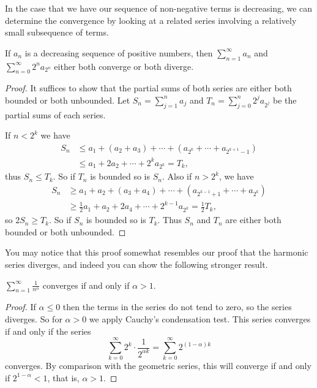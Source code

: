 In the case that we have our sequence of non-negative terms is decreasing, we can determine the convergence by looking at a related series involving a relatively small subsequence of terms.

\begin{theorem}
	If $a_n$ is a decreasing sequence of positive numbers, then $\sum_{n = 1}^{\infty} a_n$ and $\sum_{n = 0}^{\infty} 2^n a_{2^n}$ either both converge or both diverge.
\end{theorem}
\begin{proof}
It suffices to show that the partial sums of both series are either both bounded or both unbounded.
Let $S_n = \sum_{j = 1}^{n} a_j$ and $T_n = \sum_{j = 0}^n 2^j a_{2^j}$ be the partial sums of each series.

If $n < 2^k$ we have
\begin{align*}
	S_n &\leq a_1 + (a_2 + a_3) + \cdots + (a_{2^k} + \cdots + a_{2^{k + 1} - 1}) \\
	&\leq a_1 + 2 a_2 + \cdots + 2^k a_{2^k} = T_k,
\end{align*}
thus $S_n \leq T_k$. So if $T_n$ is bounded so is $S_n$. Also if $n > 2^k$, we have
\begin{align*}
	S_n &\geq a_1 + a_2 + (a_3 + a_4) + \cdots + (a_{2^{k -1}+1} + \cdots + a_{2^k}) \\
	&\geq \frac{1}{2}a_1 + a_2 + 2 a_4 + \cdots + 2^{k - 1}a_{2^k} = \frac{1}{2}T_k,
\end{align*}
so $2S_n \geq T_k$. So if $S_n$ is bounded so is $T_k$.
Thus $S_n$ and $T_n$ are either both bounded or both unbounded. 
\end{proof}

You may notice that this proof somewhat resembles our proof that the harmonic series diverges, and indeed you can show the following stronger result.

\begin{theorem}
	$\sum_{n = 1}^{\infty} \frac{1}{n^\alpha}$ converges if and only if $\alpha > 1$.
\end{theorem}
\begin{proof}
If $\alpha \leq 0$ then the terms in the series do not tend to zero, so the series diverges. So for $\alpha > 0$ we apply Cauchy's condensation test. This series converges if and only if the series
$$
\sum_{k = 0}^{\infty} 2^k \cdot \frac{1}{2^{\alpha k}} = \sum_{k = 0}^{\infty} 2^{(1 - \alpha) k}
$$
converges. By comparison with the geometric series, this will converge if and only if $2^{1 - \alpha} < 1$, that is, $\alpha > 1$.
\end{proof}


